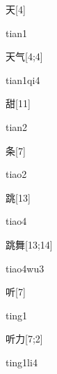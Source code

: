 \begin{verbete}[tian1]{天}[4]
\begin{pronuncia}{tian1}
\end{pronuncia}
\end{verbete}

\begin{verbete}[tian1qi4]{天气}[4;4]
\begin{pronuncia}{tian1qi4}
\end{pronuncia}
\end{verbete}

\begin{verbete}[tian2]{甜}[11]
\begin{pronuncia}{tian2}
\end{pronuncia}
\end{verbete}

\begin{verbete}[tiao2]{条}[7]
\begin{pronuncia}{tiao2}
\end{pronuncia}
\end{verbete}

\begin{verbete}[tiao4]{跳}[13]
\begin{pronuncia}{tiao4}
\end{pronuncia}
\end{verbete}

\begin{verbete}[tiao4wu3]{跳舞}[13;14]
\begin{pronuncia}{tiao4wu3}
\end{pronuncia}
\end{verbete}

\begin{verbete}[ting1]{听}[7]
\begin{pronuncia}{ting1}
\end{pronuncia}
\end{verbete}

\begin{verbete}[ting1li4]{听力}[7;2]
\begin{pronuncia}{ting1li4}
\end{pronuncia}
\end{verbete}

